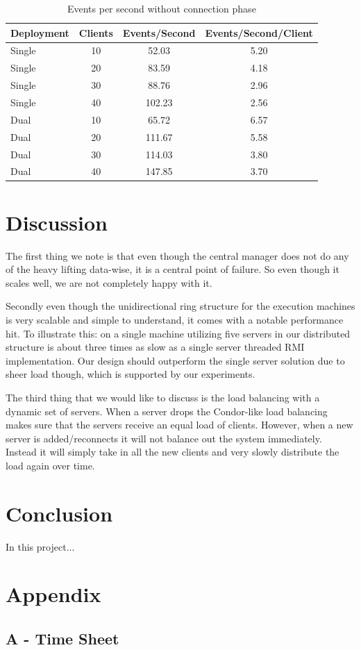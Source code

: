 \documentclass[a4paper,10pt]{article}
\begin{document}
\begin{table}
\centering
\begin{tabular}{| l | c | c | c |}
\hline
\textbf{Deployment} & \textbf{Clients} & \textbf{Events/Second}  & \textbf{Events/Second/Client} \\
\hline
\hline
Single & 10 & 52.03& 5.20\\
\hline
Single & 20 & 83.59& 4.18\\
\hline
Single & 30&88.76 & 2.96\\
\hline
Single & 40&102.23 & 2.56\\
\hline
\hline
Dual & 10 & 65.72&6.57 \\
\hline
Dual & 20 &111.67 &5.58 \\
\hline
Dual & 30 &  114.03&3.80 \\
\hline
Dual & 40 &147.85 &3.70 \\
\hline
\end{tabular}
\caption{Events per second without connection phase}
\label{tab:expeventswithout}
\end{table}

\section{Discussion}
\label{sec:discussion}
The first thing we note is that even though the central manager does not do any of the heavy lifting data-wise, it is a central point of failure.
So even though it scales well, we are not completely happy with it.

Secondly even though the unidirectional ring structure for the execution machines is very scalable and simple to understand,
it comes with a notable performance hit.
To illustrate this: on a single machine utilizing five servers in our distributed structure is about three times as slow as a single server threaded RMI implementation.
Our design should outperform the single server solution due to sheer load though, which is supported by our experiments.

The third thing that we would like to discuss is the load balancing with a dynamic set of servers.
When a server drops the Condor-like load balancing makes sure that the servers receive an equal load of clients.
However, when a new server is added/reconnects it will not balance out the system immediately.
Instead it will simply take in all the new clients and very slowly distribute the load again over time.

\section{Conclusion}
\label{sec:conclusion}
In this project...

\newpage
\section*{Appendix}

\subsection*{A - Time Sheet}
\label{sec:appendix}



\end{document}
